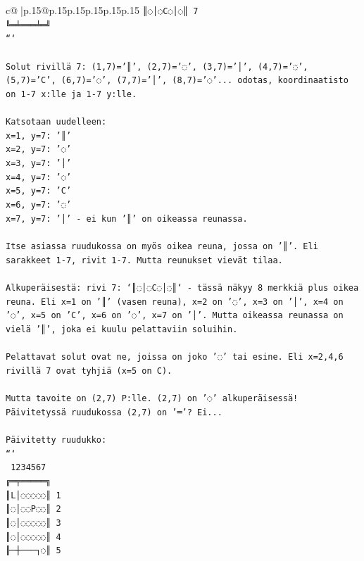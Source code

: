 \documentclass{article}
\begin{document}
{\begin{supertabular}{c@{$\;$}|p{.15\linewidth}@{}p{.15\linewidth}p{.15\linewidth}p{.15\linewidth}p{.15\linewidth}p{.15\linewidth}}
{{{\texttt{║◌│◌C◌│◌║ 7} \\
\texttt{╚═╧═══╧═╝} \\
\texttt{```} \\
\\ 
\texttt{Solut rivillä 7: (1,7)='║', (2,7)='◌', (3,7)='│', (4,7)='◌', (5,7)='C', (6,7)='◌', (7,7)='│', (8,7)='◌'... odotas, koordinaatisto on 1{-}7 x:lle ja 1{-}7 y:lle.} \\
\\ 
\texttt{Katsotaan uudelleen:} \\
\texttt{x=1, y=7: '║'} \\
\texttt{x=2, y=7: '◌'} \\
\texttt{x=3, y=7: '│'} \\
\texttt{x=4, y=7: '◌'} \\
\texttt{x=5, y=7: 'C'} \\
\texttt{x=6, y=7: '◌'} \\
\texttt{x=7, y=7: '│' {-} ei kun '║' on oikeassa reunassa.} \\
\\ 
\texttt{Itse asiassa ruudukossa on myös oikea reuna, jossa on '║'. Eli sarakkeet 1{-}7, rivit 1{-}7. Mutta reunukset vievät tilaa.} \\
\\ 
\texttt{Alkuperäisestä: rivi 7: `║◌│◌C◌│◌║` {-} tässä näkyy 8 merkkiä plus oikea reuna. Eli x=1 on '║' (vasen reuna), x=2 on '◌', x=3 on '│', x=4 on '◌', x=5 on 'C', x=6 on '◌', x=7 on '│'. Mutta oikeassa reunassa on vielä '║', joka ei kuulu pelattaviin soluihin.} \\
\\ 
\texttt{Pelattavat solut ovat ne, joissa on joko '◌' tai esine. Eli x=2,4,6 rivillä 7 ovat tyhjiä (x=5 on C).} \\
\\ 
\texttt{Mutta tavoite on (2,7) P:lle. (2,7) on '◌' alkuperäisessä! Päivitetyssä ruudukossa (2,7) on '═'? Ei...} \\
\\ 
\texttt{Päivitetty ruudukko:} \\
\texttt{```} \\
\texttt{ 1234567} \\
\texttt{╔═╤═════╗} \\
\texttt{║L│◌◌◌◌◌║ 1} \\
\texttt{║◌│◌◌P◌◌║ 2} \\
\texttt{║◌│◌◌◌◌◌║ 3} \\
\texttt{║◌│◌◌◌◌◌║ 4} \\
\texttt{╟─┼───┐◌║ 5} \\
}}}
\end{supertabular}}
\end{document}
